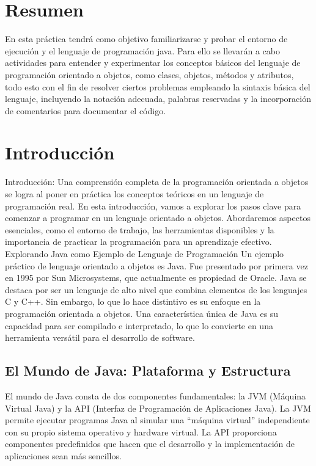 \documentclass[12pt]{article}
\begin{document}
    \section*{Resumen}
    En esta práctica tendrá como objetivo familiarizarse y probar el entorno de ejecución y el lenguaje de programación java. Para ello se llevarán a cabo actividades para entender y experimentar los conceptos básicos del lenguaje de programación orientado a objetos, como clases, objetos, métodos y atributos, todo esto con el fin de resolver ciertos problemas empleando la sintaxis básica del lenguaje, incluyendo la notación adecuada, palabras reservadas y la incorporación de comentarios para documentar el código.

    \section*{Introducción}
    Introducción:
    Una comprensión completa de la programación orientada a objetos se logra al poner en práctica los conceptos teóricos en un lenguaje de programación real. En esta introducción, vamos a explorar los pasos clave para comenzar a programar en un lenguaje orientado a objetos. Abordaremos aspectos esenciales, como el entorno de trabajo, las herramientas disponibles y la importancia de practicar la programación para un aprendizaje efectivo.
    Explorando Java como Ejemplo de Lenguaje de Programación
    Un ejemplo práctico de lenguaje orientado a objetos es Java. Fue presentado por primera vez en 1995 por Sun Microsystems, que actualmente es propiedad de Oracle. Java se destaca por ser un lenguaje de alto nivel que combina elementos de los lenguajes C y C++. Sin embargo, lo que lo hace distintivo es su enfoque en la programación orientada a objetos. Una característica única de Java es su capacidad para ser compilado e interpretado, lo que lo convierte en una herramienta versátil para el desarrollo de software.

    \subsection*{El Mundo de Java: Plataforma y Estructura}
    El mundo de Java consta de dos componentes fundamentales: la JVM (Máquina Virtual Java) y la API (Interfaz de Programación de Aplicaciones Java). La JVM permite ejecutar programas Java al simular una ``máquina virtual'' independiente con su propio sistema operativo y hardware virtual. La API proporciona componentes predefinidos que hacen que el desarrollo y la implementación de aplicaciones sean más sencillos.
    
\end{document}

